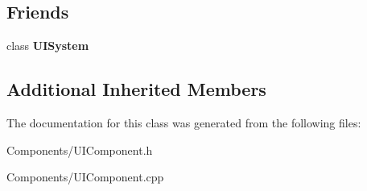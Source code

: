 \subsection*{Friends}
\begin{DoxyCompactItemize}
\item 
\mbox{\label{classUIComponent_a3c5cff3eae5326599fd1851d48d2a07b}} 
class {\bfseries U\+I\+System}
\end{DoxyCompactItemize}
\subsection*{Additional Inherited Members}


The documentation for this class was generated from the following files\+:\begin{DoxyCompactItemize}
\item 
Components/U\+I\+Component.\+h\item 
Components/U\+I\+Component.\+cpp\end{DoxyCompactItemize}
